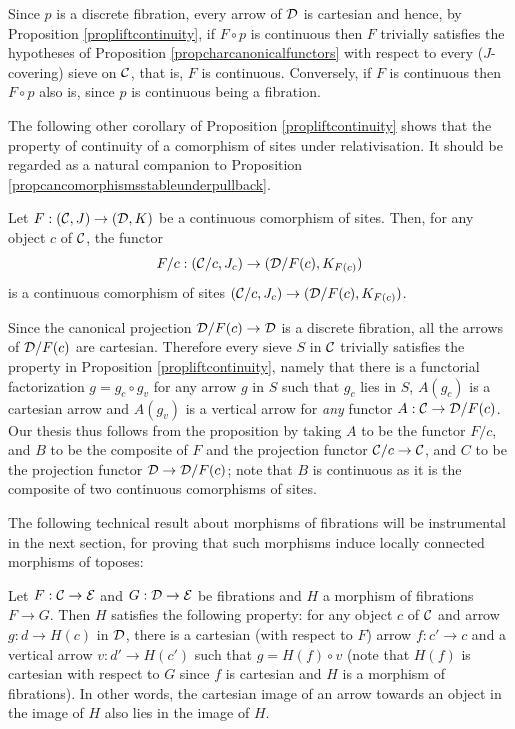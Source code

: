 \documentclass[a4paper,12pt]{article}
\begin{document}
\begin{proofs}
	Since $p$ is a discrete fibration, every arrow of $\cal D$ is cartesian and hence, by Proposition \ref{propliftcontinuity}, if $F\circ p$ is continuous then $F$ trivially satisfies the hypotheses of Proposition \ref{propcharcanonicalfunctors} with respect to every ($J$-covering) sieve on $\cal C$, that is, $F$ is continuous. Conversely, if $F$ is continuous then $F\circ p$ also is, since $p$ is continuous being a fibration.  
\end{proofs}

The following other corollary of Proposition \ref{propliftcontinuity} shows that the property of continuity of a comorphism of sites under relativisation. It should be regarded as a natural companion to Proposition \ref{propcancomorphismsstableunderpullback}.

\begin{corollary}
	Let $F:({\cal C}, J)\to ({\cal D}, K)$ be a continuous comorphism of sites. Then, for any object $c$ of $\cal C$, the functor
	\[
	F\slash c: ({\cal C}\slash c, J_{c}) \to ({\cal D}\slash F(c), K_{F(c)})
	\]
	is a continuous comorphism of sites $({\cal C}\slash c, J_{c}) \to ({\cal D}\slash F(c), K_{F(c)})$.
\end{corollary}

\begin{proofs}
	Since the canonical projection ${\cal D}\slash F(c)\to {\cal D}$ is a discrete fibration, all the arrows of ${\cal D}\slash F(c)$ are cartesian. Therefore every sieve $S$ in $\cal C$ trivially satisfies the property in Proposition \ref{propliftcontinuity}, namely that there is a functorial factorization $g=g_{c}\circ g_{v}$ for any arrow $g$ in $S$ such that $g_{c}$ lies in $S$, $A(g_{c})$ is a cartesian arrow and $A(g_{v})$ is a vertical arrow for \emph{any} functor $A:{\cal C}\to {\cal D}\slash F(c)$. Our thesis thus follows from the proposition by taking $A$ to be the functor $F\slash c$, and $B$ to be the composite of $F$ and the projection functor ${\cal C}\slash c \to {\cal C}$, and $C$ to be the projection functor ${\cal D}\to {\cal D}\slash F(c)$; note that $B$ is continuous as it is the composite of two continuous comorphisms of sites.  
\end{proofs}

The following technical result about morphisms of fibrations will be instrumental in the next section, for proving that such morphisms induce locally connected morphisms of toposes:

\begin{proposition}\label{proppropertymorphismsoffibrations}
Let $F:{\cal C}\to {\cal E}$ and $G:{\cal D}\to {\cal E}$ be fibrations and $H$ a morphism of fibrations $F\to G$. Then $H$ satisfies the following property: for any object $c$ of $\cal C$ and arrow $g:d\to H(c)$ in $\cal D$, there is a cartesian (with respect to $F$) arrow $f:c'\to c$ and a vertical arrow $v:d'\to H(c')$ such that $g=H(f)\circ v$ (note that $H(f)$ is cartesian with respect to $G$ since $f$ is cartesian and $H$ is a morphism of fibrations). In other words, the cartesian image of an arrow towards an object in the image of $H$ also lies in the image of $H$. 	
\end{proposition}
\end{document}
